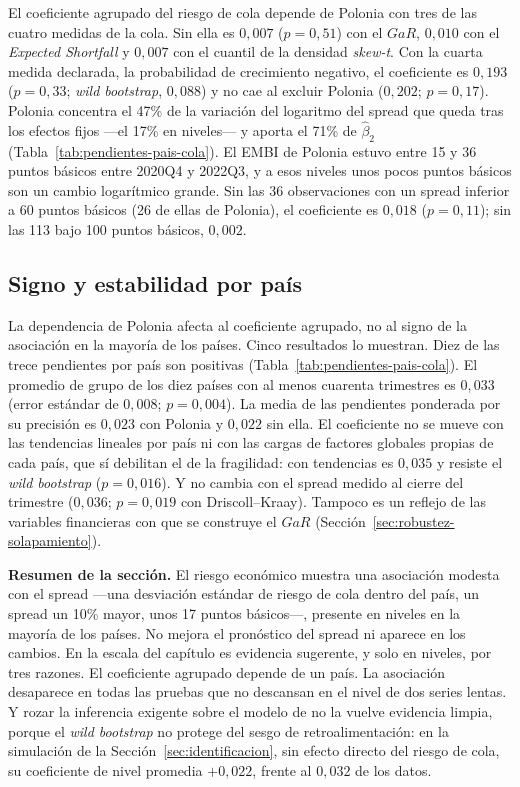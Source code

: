 El coeficiente agrupado del riesgo de cola depende de Polonia con tres de las cuatro medidas de la cola. Sin ella es $0{,}007$ ($p=0{,}51$) con el $GaR$, $0{,}010$ con el \textit{Expected Shortfall} y $0{,}007$ con el cuantil de la densidad \textit{skew-t}. Con la cuarta medida declarada, la probabilidad de crecimiento negativo, el coeficiente es $0{,}193$ ($p=0{,}33$; \textit{wild bootstrap}, $0{,}088$) y no cae al excluir Polonia ($0{,}202$; $p=0{,}17$). Polonia concentra el 47\% de la variación del logaritmo del spread que queda tras los efectos fijos ---el 17\% en niveles--- y aporta el 71\% de $\hat\beta_2$ (Tabla~\ref{tab:pendientes-pais-cola}). El EMBI de Polonia estuvo entre 15 y 36 puntos básicos entre 2020Q4 y 2022Q3, y a esos niveles unos pocos puntos básicos son un cambio logarítmico grande. Sin las 36 observaciones con un spread inferior a 60 puntos básicos (26 de ellas de Polonia), el coeficiente es $0{,}018$ ($p=0{,}11$); sin las 113 bajo 100 puntos básicos, $0{,}002$.

\subsection{Signo y estabilidad por país}

La dependencia de Polonia afecta al coeficiente agrupado, no al signo de la asociación en la mayoría de los países. Cinco resultados lo muestran. Diez de las trece pendientes por país son positivas (Tabla~\ref{tab:pendientes-pais-cola}). El promedio de grupo de los diez países con al menos cuarenta trimestres es $0{,}033$ (error estándar de $0{,}008$; $p=0{,}004$). La media de las pendientes ponderada por su precisión es $0{,}023$ con Polonia y $0{,}022$ sin ella. El coeficiente no se mueve con las tendencias lineales por país ni con las cargas de factores globales propias de cada país, que sí debilitan el de la fragilidad: con tendencias es $0{,}035$ y resiste el \textit{wild bootstrap} ($p=0{,}016$). Y no cambia con el spread medido al cierre del trimestre ($0{,}036$; $p=0{,}019$ con Driscoll--Kraay). Tampoco es un reflejo de las variables financieras con que se construye el $GaR$ (Sección~\ref{sec:robustez-solapamiento}).

\textbf{Resumen de la sección.} El riesgo económico muestra una asociación modesta con el spread ---una desviación estándar de riesgo de cola dentro del país, un spread un 10\% mayor, unos 17 puntos básicos---, presente en niveles en la mayoría de los países. No mejora el pronóstico del spread ni aparece en los cambios. En la escala del capítulo es evidencia sugerente, y solo en niveles, por tres razones. El coeficiente agrupado depende de un país. La asociación desaparece en todas las pruebas que no descansan en el nivel de dos series lentas. Y rozar la inferencia exigente sobre el modelo de \citet{Chari2024b} no la vuelve evidencia limpia, porque el \textit{wild bootstrap} no protege del sesgo de retroalimentación: en la simulación de la Sección~\ref{sec:identificacion}, sin efecto directo del riesgo de cola, su coeficiente de nivel promedia $+0{,}022$, frente al $0{,}032$ de los datos.

